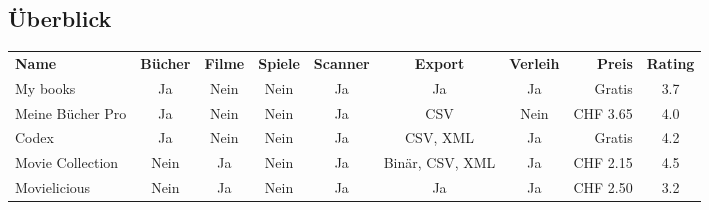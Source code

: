\newpage

\begin{landscape}
	\section{Überblick} 
	\begin{tabular}{|l|c|c|c|c|c|c|r|c|}
		\rowcolor{black} 
		\color{white}\textbf{Name} & \color{white}\textbf{Bücher} & \color{white}\textbf{Filme} & \color{white}\textbf{Spiele} & \color{white}\textbf{Scanner} & \color{white}\textbf{Export} & \color{white}\textbf{Verleih} & \color{white}\textbf{Preis} & \color{white}\textbf{Rating} \\
		My books & Ja & \color{red}Nein & \color{red}Nein & Ja & Ja & Ja & Gratis & 3.7 \\ \hline
		\rowcolor{DarkSeaGreen} Meine Bücher Pro & Ja & \color{red}Nein & \color{red}Nein & Ja & CSV & \color{black}Nein & CHF 3.65 & 4.0 \\ \hline
		Codex & Ja & \color{red}Nein & \color{red}Nein & Ja & CSV, XML & Ja & Gratis & 4.2 \\ \hline
		\rowcolor{DarkSeaGreen} Movie Collection & \color{red}Nein & Ja & \color{red}Nein & Ja & Binär, CSV, XML & Ja & CHF 2.15 & 4.5 \\ \hline
		Movielicious & \color{red}Nein & Ja & \color{red}Nein & Ja & Ja & Ja & CHF 2.50 & 3.2 \\ \hline
	\end{tabular} 
\end{landscape} 